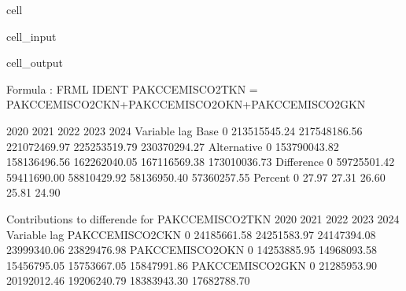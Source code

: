 \documentclass[letterpaper,10pt,english]{jupyterBook}
\begin{document}
\begin{sphinxuseclass}{cell}\begin{sphinxVerbatimInput}

\begin{sphinxuseclass}{cell_input}
\begin{sphinxVerbatim}[commandchars=\\\{\}]
  
\end{sphinxVerbatim}

\end{sphinxuseclass}\end{sphinxVerbatimInput}
\begin{sphinxVerbatimOutput}

\begin{sphinxuseclass}{cell_output}
\begin{sphinxVerbatim}[commandchars=\\\{\}]
Formula        : FRML \PYGZlt{}IDENT\PYGZgt{} PAKCCEMISCO2TKN = PAKCCEMISCO2CKN+PAKCCEMISCO2OKN+PAKCCEMISCO2GKN \PYGZdl{} 

                        2020         2021         2022         2023         2024
Variable    lag                                                                 
Base        0   213515545.24 217548186.56 221072469.97 225253519.79 230370294.27
Alternative 0   153790043.82 158136496.56 162262040.05 167116569.38 173010036.73
Difference  0   \PYGZhy{}59725501.42 \PYGZhy{}59411690.00 \PYGZhy{}58810429.92 \PYGZhy{}58136950.40 \PYGZhy{}57360257.55
Percent     0         \PYGZhy{}27.97       \PYGZhy{}27.31       \PYGZhy{}26.60       \PYGZhy{}25.81       \PYGZhy{}24.90

 Contributions to differende for  PAKCCEMISCO2TKN
                            2020         2021         2022         2023         2024
Variable        lag                                                                 
PAKCCEMISCO2CKN 0   \PYGZhy{}24185661.58 \PYGZhy{}24251583.97 \PYGZhy{}24147394.08 \PYGZhy{}23999340.06 \PYGZhy{}23829476.98
PAKCCEMISCO2OKN 0   \PYGZhy{}14253885.95 \PYGZhy{}14968093.58 \PYGZhy{}15456795.05 \PYGZhy{}15753667.05 \PYGZhy{}15847991.86
PAKCCEMISCO2GKN 0   \PYGZhy{}21285953.90 \PYGZhy{}20192012.46 \PYGZhy{}19206240.79 \PYGZhy{}18383943.30 \PYGZhy{}17682788.70


\end{sphinxVerbatim}
\end{sphinxuseclass}
\end{sphinxVerbatimOutput}
\end{sphinxuseclass}
\end{document}
